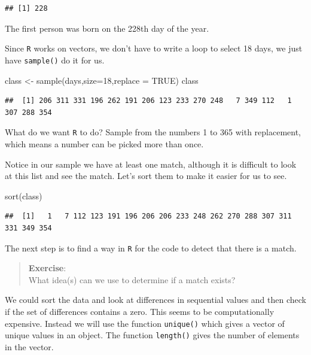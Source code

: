\documentclass[
]{book}
\newenvironment{Shaded}{\begin{snugshade}}{\end{snugshade}}
\newcommand{\AttributeTok}[1]{\textcolor[rgb]{0.77,0.63,0.00}{#1}}
\newcommand{\ConstantTok}[1]{\textcolor[rgb]{0.00,0.00,0.00}{#1}}
\newcommand{\DecValTok}[1]{\textcolor[rgb]{0.00,0.00,0.81}{#1}}
\newcommand{\FunctionTok}[1]{\textcolor[rgb]{0.00,0.00,0.00}{#1}}
\newcommand{\NormalTok}[1]{#1}
\newcommand{\OtherTok}[1]{\textcolor[rgb]{0.56,0.35,0.01}{#1}}
\begin{document}
\begin{verbatim}
## [1] 228
\end{verbatim}

The first person was born on the 228th day of the year.

Since \texttt{R} works on vectors, we don't have to write a loop to select 18 days, we just have \texttt{sample()} do it for us.

\begin{Shaded}
\begin{Highlighting}[]
\NormalTok{class }\OtherTok{\textless{}{-}} \FunctionTok{sample}\NormalTok{(days,}\AttributeTok{size=}\DecValTok{18}\NormalTok{,}\AttributeTok{replace =} \ConstantTok{TRUE}\NormalTok{)}
\NormalTok{class}
\end{Highlighting}
\end{Shaded}

\begin{verbatim}
##  [1] 206 311 331 196 262 191 206 123 233 270 248   7 349 112   1 307 288 354
\end{verbatim}

What do we want \texttt{R} to do? Sample from the numbers 1 to 365 with replacement, which means a number can be picked more than once.

Notice in our sample we have at least one match, although it is difficult to look at this list and see the match. Let's sort them to make it easier for us to see.

\begin{Shaded}
\begin{Highlighting}[]
\FunctionTok{sort}\NormalTok{(class)}
\end{Highlighting}
\end{Shaded}

\begin{verbatim}
##  [1]   1   7 112 123 191 196 206 206 233 248 262 270 288 307 311 331 349 354
\end{verbatim}

The next step is to find a way in \texttt{R} for the code to detect that there is a match.

\begin{quote}
\textbf{Exercise}:\\
What idea(s) can we use to determine if a match exists?
\end{quote}

We could sort the data and look at differences in sequential values and then check if the set of differences contains a zero. This seems to be computationally expensive. Instead we will use the function \texttt{unique()} which gives a vector of unique values in an object. The function \texttt{length()} gives the number of elements in the vector.
\end{document}
